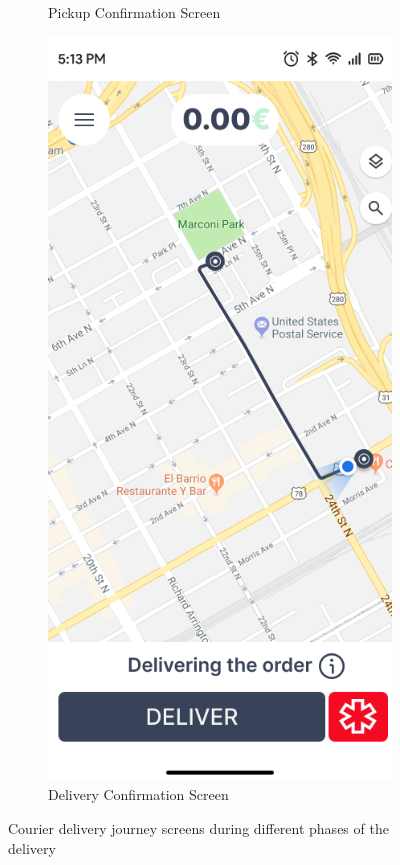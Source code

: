 \begin{figure}[H]
\begin{subfigure}[b]{0.48\textwidth}
        \caption{Pickup Confirmation Screen}
        \label{fig:pickup_order}
    \end{subfigure}
    \hfill
    \begin{subfigure}[b]{0.48\textwidth}
        \centering
        \includegraphics[width=\textwidth]{images/deliver_order_screen.png}
        \caption{Delivery Confirmation Screen}
        \label{fig:deliver_order}
    \end{subfigure}
    \caption{Courier delivery journey screens during different phases of the delivery}
    \label{fig:courier_journey}
\end{figure}

